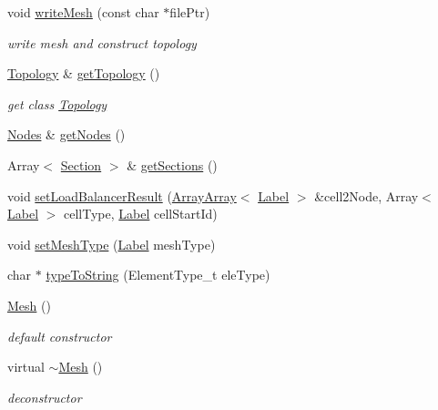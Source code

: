 \begin{DoxyCompactItemize}
void \hyperlink{classHSF_1_1Mesh_a2cd3b5d0f1dcf97d7b4cb565b32bcaf8}{writeMesh} (const char $\ast$filePtr)
\begin{DoxyCompactList}\small\item\em write mesh and construct topology \item\end{DoxyCompactList}\item 
\hyperlink{classHSF_1_1Topology}{Topology} \& \hyperlink{classHSF_1_1Mesh_a3a340c548e7bf152dc70722cb64ab61c}{getTopology} ()
\begin{DoxyCompactList}\small\item\em get class \hyperlink{classHSF_1_1Topology}{Topology} \item\end{DoxyCompactList}\item 
\hyperlink{classHSF_1_1Nodes}{Nodes} \& \hyperlink{classHSF_1_1Mesh_aef198f95314eb6938a1713b07337155f}{getNodes} ()
\item 
Array$<$ \hyperlink{classHSF_1_1Section}{Section} $>$ \& \hyperlink{classHSF_1_1Mesh_a4c3c5c8a8ccd5413c01c05592863a5ea}{getSections} ()
\item 
void \hyperlink{classHSF_1_1Mesh_aef90381f0de5a072b710906f955717fd}{setLoadBalancerResult} (\hyperlink{classHSF_1_1ArrayArray}{ArrayArray}$<$ \hyperlink{namespaceHSF_ae65d72be782e989396ebe5ec6ae4c2b6}{Label} $>$ \&cell2Node, Array$<$ \hyperlink{namespaceHSF_ae65d72be782e989396ebe5ec6ae4c2b6}{Label} $>$ cellType, \hyperlink{namespaceHSF_ae65d72be782e989396ebe5ec6ae4c2b6}{Label} cellStartId)
\item 
void \hyperlink{classHSF_1_1Mesh_a00a74cf612e08f90f88ada5c33a2a802}{setMeshType} (\hyperlink{namespaceHSF_ae65d72be782e989396ebe5ec6ae4c2b6}{Label} meshType)
\item 
char $\ast$ \hyperlink{classHSF_1_1Mesh_a5e48ab70f682c324a222208fceb66388}{typeToString} (ElementType\_\-t eleType)
\item 
\hyperlink{classHSF_1_1Mesh_acbd942f68387a832b8f7d5927db54eea}{Mesh} ()
\begin{DoxyCompactList}\small\item\em default constructor \item\end{DoxyCompactList}\item 
virtual \hyperlink{classHSF_1_1Mesh_a3920b19d7969a8bb5d1eb505ec9f43b4}{$\sim$Mesh} ()
\begin{DoxyCompactList}\small\item\em deconstructor \item\end{DoxyCompactList}\item 

\end{DoxyCompactItemize}
